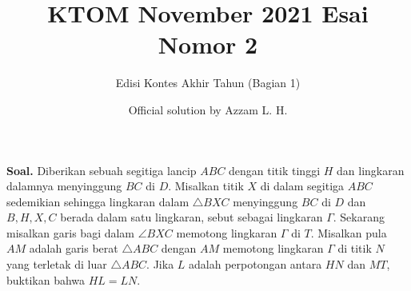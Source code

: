 \documentclass[12pt]{scrartcl}
\title{KTOM November 2021 Esai Nomor 2 }
\author{Edisi Kontes Akhir Tahun (Bagian 1)}
\date{Official solution by Azzam L. H.}
\begin{document}
\maketitle
\pagestyle{plain}
\noindent
 \textbf{Soal.} Diberikan sebuah segitiga lancip $ABC$ dengan titik tinggi $H$ dan lingkaran dalamnya menyinggung $BC$ di $D$. Misalkan titik $X$ di dalam segitiga $ABC$ sedemikian sehingga lingkaran dalam $\triangle BXC$ menyinggung $BC$ di $D$ dan $B,H,X,C$ berada dalam satu lingkaran, sebut sebagai lingkaran $\Gamma$.  Sekarang misalkan garis bagi dalam $\angle BXC$ memotong lingkaran $\Gamma$ di $T$. Misalkan pula $AM$ adalah garis berat $\triangle ABC$ dengan $AM$ memotong lingkaran $\Gamma$ di titik $N$ yang terletak di luar $\triangle ABC$. Jika $L$ adalah perpotongan antara $HN$ dan $MT$, buktikan bahwa $HL=LN$.	
 \newpage	

 \usetikzlibrary{arrows}
 \pagestyle{empty}
 
 
\end{document}
